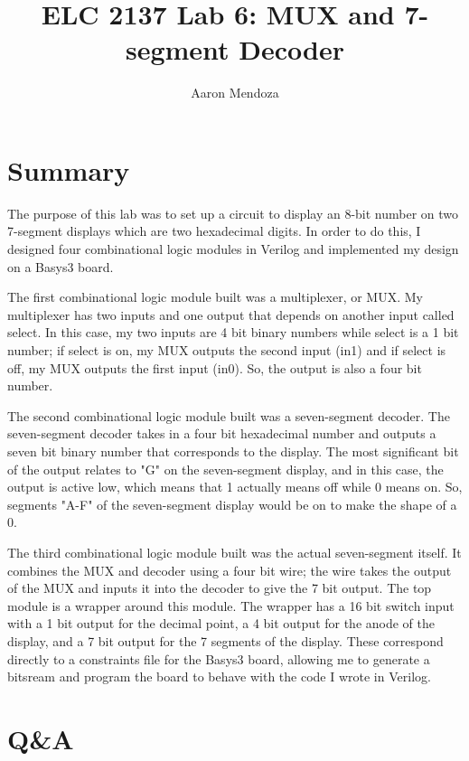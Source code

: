 \documentclass[11pt]{article}
\begin{document}
\title{ELC 2137 Lab 6: MUX and 7-segment Decoder}
\author{Aaron Mendoza}

\maketitle


\section*{Summary}

The purpose of this lab was to set up a circuit to display an 8-bit number on two 7-segment displays which are two hexadecimal digits. In order to do this, I designed four combinational logic modules in Verilog and implemented my design on a Basys3 board.

The first combinational logic module built was a multiplexer, or MUX. My multiplexer has two inputs and one output that depends on another input called select. In this case, my two inputs are 4 bit binary numbers while select is a 1 bit number; if select is on, my MUX outputs the second input (in1) and if select is off, my MUX outputs the first input (in0). So, the output is also a four bit number.

The second combinational logic module built was a seven-segment decoder. The seven-segment decoder takes in a four bit hexadecimal number and outputs a seven bit binary number that corresponds to the display. The most significant bit of the output relates to "G" on the seven-segment display, and in this case, the output is active low, which means that 1 actually means off while 0 means on. So, segments "A-F" of the seven-segment display would be on to make the shape of a 0.

The third combinational logic module built was the actual seven-segment itself. It combines the MUX and decoder using a four bit wire; the wire takes the output of the MUX and inputs it into the decoder to give the 7 bit output. The top module is a wrapper around this module. The wrapper has a 16 bit switch input with a 1 bit output for the decimal point, a 4 bit output for the anode of the display, and a 7 bit output for the 7 segments of the display. These correspond directly to a constraints file for the Basys3 board, allowing me to generate a bitsream and program the board to behave with the code I wrote in Verilog. 


\section*{Q\&A}
\end{document}

